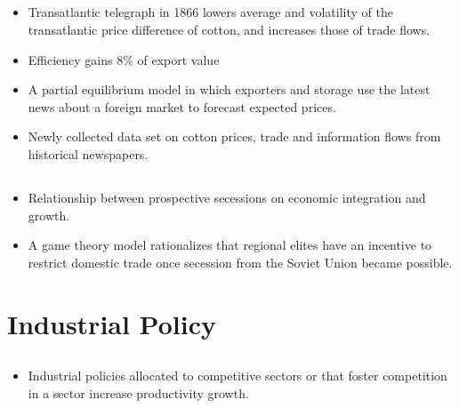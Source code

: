 \documentclass[10pt]{article} %
\begin{document}
    \subsection{\cite{Steinwender2018}}
    \begin{itemize}
        \item Transatlantic telegraph in 1866 lowers average and volatility of the transatlantic price difference of cotton, and increases those of trade flows. 
        \item Efficiency gains 8\% of export value
        \item A partial equilibrium model in which exporters and storage use the latest news about a foreign market to forecast expected prices.
        \item Newly collected data set on cotton prices, trade and information flows from historical newspapers.
    \end{itemize}

    \subsection{\cite{Suesse2018}}
    \begin{itemize}
        \item Relationship between prospective secessions on economic integration and growth.
        \item A game theory model rationalizes that regional elites have an incentive to restrict domestic trade once secession from the Soviet Union became possible.
    \end{itemize}

\section{Industrial Policy}

    \subsection{\cite{Aghionetal2015}}
    \begin{itemize}
        \item Industrial policies allocated to competitive sectors or that foster competition in a sector increase productivity growth.
    \end{itemize}

    \subsection{\cite{JuhaszLaneRodrik2023}}
\end{document}
